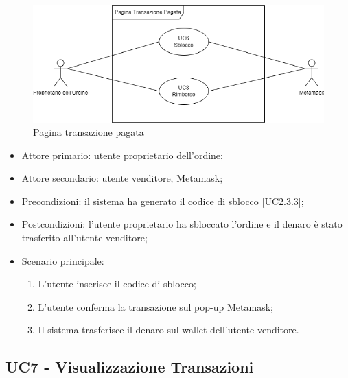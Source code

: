 \begin{figure}[H]
    \centering
    \includegraphics[scale=0.7]{immagini/UseCases-UC6.png}
    \caption{Pagina transazione pagata}
\end{figure}

\begin{itemize}
    \item Attore primario: utente proprietario dell'ordine;
    \item Attore secondario: utente venditore, Metamask\glo{};
    \item Precondizioni: il sistema ha generato il codice di sblocco [UC2.3.3];
    \item Postcondizioni: l'utente proprietario ha sbloccato l'ordine e il denaro è stato trasferito all'utente venditore;
    \item Scenario principale:
          \begin{enumerate}
              \item L'utente inserisce il codice di sblocco;
              \item L'utente conferma la transazione sul pop-up Metamask\glo{};
              \item Il sistema trasferisce il denaro sul wallet\glo{} dell'utente venditore.
          \end{enumerate}
\end{itemize}

\subsection{UC7 - Visualizzazione Transazioni}

